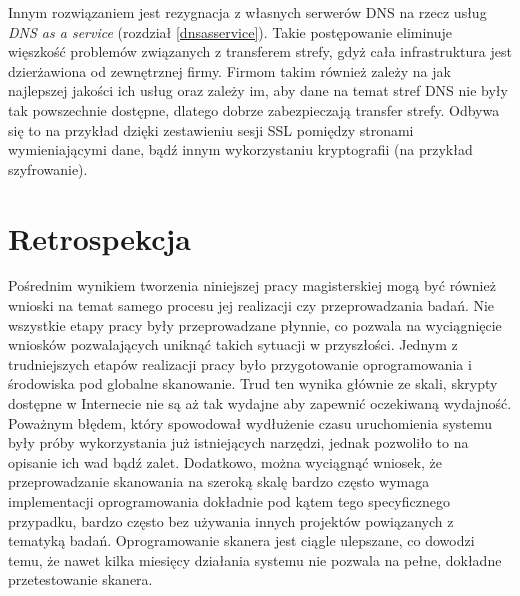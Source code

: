 Innym rozwiązaniem jest rezygnacja z własnych serwerów DNS na rzecz usług \textit{DNS as a service} (rozdział \ref{dnsasservice}). Takie postępowanie eliminuje więszkość
problemów związanych z transferem strefy, gdyż cała infrastruktura jest dzierżawiona od zewnętrznej firmy. Firmom takim również zależy
na jak najlepszej jakości ich usług oraz zależy im, aby dane na temat stref DNS nie były tak powszechnie dostępne, dlatego dobrze
zabezpieczają transfer strefy. Odbywa się to na przykład dzięki zestawieniu sesji SSL pomiędzy stronami wymieniającymi dane, bądź
innym wykorzystaniu kryptografii (na przykład szyfrowanie).

\section{Retrospekcja}
\noindent Pośrednim wynikiem tworzenia niniejszej pracy magisterskiej mogą być również wnioski na temat samego procesu jej realizacji czy przeprowadzania badań.
Nie wszystkie etapy pracy były przeprowadzane płynnie, co pozwala na wyciągnięcie wniosków pozwalających uniknąć takich sytuacji
w przyszłości. Jednym z trudniejszych etapów realizacji pracy było przygotowanie oprogramowania i środowiska pod globalne skanowanie.
Trud ten wynika głównie ze skali, skrypty dostępne w Internecie nie są aż tak wydajne aby zapewnić oczekiwaną wydajność. Poważnym
błędem, który spowodował wydłużenie czasu uruchomienia systemu były próby wykorzystania już istniejących narzędzi, jednak pozwoliło to
na opisanie ich wad bądź zalet. Dodatkowo, można wyciągnąć wniosek, że przeprowadzanie skanowania na szeroką skalę bardzo często wymaga
implementacji oprogramowania dokładnie pod kątem tego specyficznego przypadku, bardzo często bez używania innych projektów powiązanych
z tematyką badań. Oprogramowanie skanera jest ciągle ulepszane, co dowodzi temu, że nawet kilka miesięcy działania systemu nie pozwala
na pełne, dokładne przetestowanie skanera.
